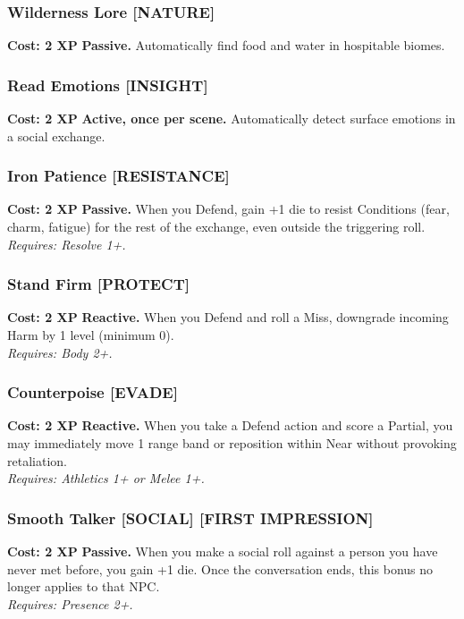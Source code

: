 \subsubsection*{Wilderness Lore \textnormal{[NATURE]}}
\label{talent:wilderness-lore}
\textbf{Cost: 2 XP} \textbf{Passive.} Automatically find food and water in hospitable biomes.

\subsubsection*{Read Emotions \textnormal{[INSIGHT]}}
\label{talent:read-emotions}
\textbf{Cost: 2 XP} \textbf{Active, once per scene.} Automatically detect surface emotions in a social exchange.

\subsubsection*{Iron Patience \textnormal{[RESISTANCE]}}
\label{talent:iron-patience}
\textbf{Cost: 2 XP} \textbf{Passive.} When you Defend, gain +1 die to resist Conditions (fear, charm, fatigue) for the rest of the exchange, even outside the triggering roll. \\
\textit{Requires: Resolve 1+.}

\subsubsection*{Stand Firm \textnormal{[PROTECT]}}
\label{talent:stand-firm}
\textbf{Cost: 2 XP} \textbf{Reactive.} When you Defend and roll a Miss, downgrade incoming Harm by 1 level (minimum 0). \\
\textit{Requires: Body 2+.}

\subsubsection*{Counterpoise \textnormal{[EVADE]}}
\label{talent:counterpoise}
\textbf{Cost: 2 XP} \textbf{Reactive.} When you take a Defend action and score a Partial, you may immediately move 1 range band or reposition within Near without provoking retaliation. \\
\textit{Requires: Athletics 1+ or Melee 1+.}

\subsubsection*{Smooth Talker \textnormal{[SOCIAL] [FIRST IMPRESSION]}}
\label{talent:smooth-talker}
\textbf{Cost: 2 XP} \textbf{Passive.} When you make a social roll against a person you have never met before, you gain +1 die. Once the conversation ends, this bonus no longer applies to that NPC. \\
\textit{Requires: Presence 2+.}

